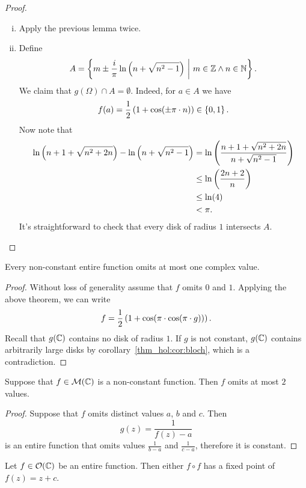 \begin{proof}
\phantom{a}
\begin{enumerate}[i)]
\item Apply the previous lemma twice.
\item Define
\[
A =
\left\{m \pm \frac{i}{\pi} \ln \left(n + \sqrt{n^2-1}\right)~\middle\vert~m \in \mathbb{Z} \land n \in \mathbb{N}\right\}.
\]
We claim that $g(\Omega) \cap A = \emptyset$. Indeed, for $a \in A$
we have
\[
f(a) = \frac{1}{2} \left(1 + \cos(\pm \pi \cdot n)\right) \in \left\{0,1\right\}.
\]
Now note that
\begin{align*}
\ln \left(n+1 + \sqrt{n^2 + 2n}\right) - \ln \left(n + \sqrt{n^2-1}\right) &=
\ln \left(\frac{n+1 + \sqrt{n^2 + 2n}}{n + \sqrt{n^2 - 1}}\right)
\\
&\leq
\ln \left(\frac{2n + 2}{n}\right)
\\
&\leq \ln(4)
\\
&<
\pi.
\end{align*}
It's straightforward to check that every disk of radius $1$
intersects $A$. \qedhere
\end{enumerate}
\end{proof}

\begin{izrek}
Every non-constant entire function omits at most one complex value.
\end{izrek}

\begin{proof}
Without loss of generality assume that $f$ omits $0$ and $1$.
Applying the above theorem, we can write
\[
f = \frac{1}{2} \left(1 + \cos(\pi \cdot \cos(\pi \cdot g))\right).
\]
Recall that $g(\mathbb{C})$ contains no disk of radius $1$. If $g$ is
not constant, $g(\mathbb{C})$ contains arbitrarily large disks by
corollary~\ref{thm_hol:cor:bloch}, which is a contradiction.
\end{proof}

\begin{posledica}
Suppose that $f \in \mathcal{M}(\mathbb{C})$ is a non-constant function.
Then $f$ omits at most $2$ values.
\end{posledica}

\begin{proof}
Suppose that $f$ omits distinct values $a$, $b$ and $c$. Then
\[
g(z) = \frac{1}{f(z) - a}
\]
is an entire function that omits values $\frac{1}{b-a}$ and
$\frac{1}{c-a}$, therefore it is constant.
\end{proof}

\begin{izrek}
Let $f \in \mathcal{O}(\mathbb{C})$ be an entire function. Then either
$f \circ f$ has a fixed point of $f(z) = z + c$.
\end{izrek}

